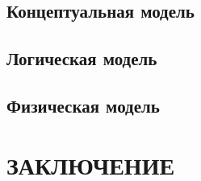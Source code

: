 \documentclass[12pt, a4paper, simple]{eskdtext}
\begin{document}
    \subsection{Концептуальная модель}
    \subsection{Логическая модель}
    \subsection{Физическая модель}
    \newpage

    \newpage
    \section*{ЗАКЛЮЧЕНИЕ}
    \newpage

    \newpage
\end{document}
